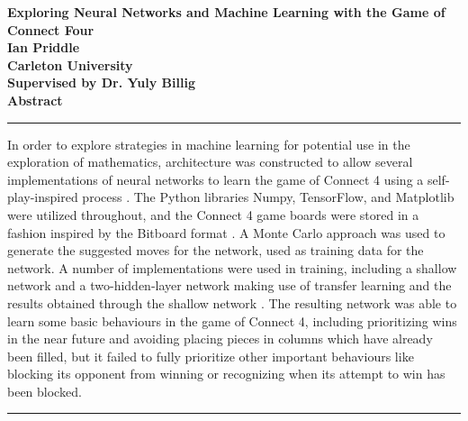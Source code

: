 \documentclass[12pt]{article}
\begin{document}
\newcommand{\mx}[1]{\begin{pmatrix}#1\end{pmatrix}} %

\begin{titlepage}
\begin{center}
\bgroup\Huge\textbf{Exploring Neural Networks and Machine Learning with the Game of Connect Four}\\ \egroup
\vspace*{0.5in}
\bgroup\Large\textbf{Ian Priddle}\\
\vspace*{0.1in}
\textbf{Carleton University}\\
\vspace*{0.1in}
\textbf{Supervised by Dr. Yuly Billig}\\ \egroup
\vspace*{0.5in}
\bgroup\LARGE\textbf{Abstract}\\ \egroup
\vspace*{0.1in}
\hrule
\vspace*{0.1in}
\begin{minipage}{0.9\textwidth}
In order to explore strategies in machine learning for potential use in the exploration of mathematics, architecture was constructed to allow several implementations of neural networks to learn the game of Connect 4 using a self-play-inspired process \cite{AlphaGo}. The Python libraries Numpy, TensorFlow, and Matplotlib were utilized throughout, and the Connect 4 game boards were stored in a fashion inspired by the Bitboard format \cite{NumPy, TensorFlow, Plot, Bitboard}. A Monte Carlo approach was used to generate the suggested moves for the network, used as training data for the network. A number of implementations were used in training, including a shallow network and a two-hidden-layer network making use of transfer learning and the results obtained through the shallow network \cite{TransferLearning}. The resulting network was able to learn some basic behaviours in the game of Connect 4, including prioritizing wins in the near future and avoiding placing pieces in columns which have already been filled, but it failed to fully prioritize other important behaviours like blocking its opponent from winning or recognizing when its attempt to win has been blocked.
\end{minipage}
\vspace*{0.1in}
\hrule
\end{center}
\end{titlepage}
\end{document}
